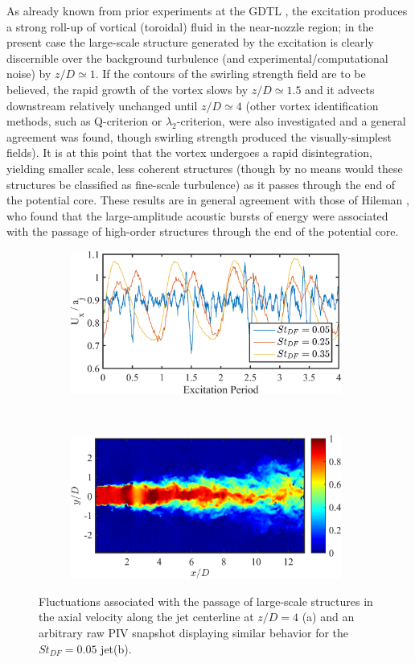 As already known from prior experiments at the GDTL \citep{Kearney-Fischer2009}, the excitation produces a strong roll-up of vortical (toroidal) fluid in the near-nozzle region; in the present case the large-scale structure generated by the excitation is clearly discernible over the background turbulence (and experimental/computational noise) by $z/D \simeq 1$.
If the contours of the swirling strength field are to be believed, the rapid growth of the vortex slows by $z/D \simeq 1.5$ and it advects downstream relatively unchanged until  $z/D \simeq 4$ (other vortex identification methods, such as Q-criterion or $\lambda_2$-criterion, were also investigated and a general agreement was found, though swirling strength produced the visually-simplest fields).
It is at this point that the vortex undergoes a rapid disintegration, yielding smaller scale, less coherent structures (though by no means would these structures be classified as fine-scale turbulence) as it passes through the end of the potential core.
These results are in general agreement with those of Hileman \etal \citep{Hileman2005}, who found that the large-amplitude acoustic bursts of energy were associated with the passage of high-order structures through the end of the potential core.
\begin{figure}
	\centering
	\begin{subfigure}{1\textwidth}
		\centering
		\includegraphics[width=3.5in]{Figures/ch4_centerline_mach_temporal.png}
		\caption{}
		\label{fig:ch4_centerlinemach_temporal}
	\end{subfigure}\\
	\begin{subfigure}{1\textwidth}
		\centering
		\includegraphics[width=3.5in]{Figures/ch4_rawUx_acceleration.png}
		\caption{}
		\label{fig:ch4_St005_rawUx_snapshot}
	\end{subfigure}
	\caption{Fluctuations associated with the passage of large-scale structures in the axial velocity along the jet centerline at $z/D = 4$ (a) and an arbitrary raw PIV snapshot displaying similar behavior for the $St_{DF}  = 0.05$ jet(b).}
\end{figure}

